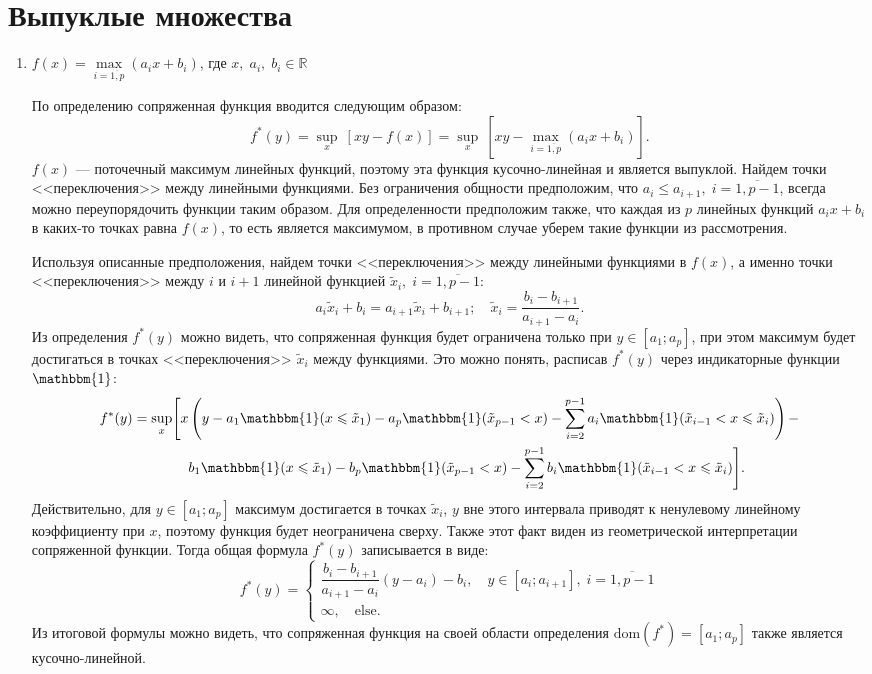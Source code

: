 \documentclass[a4paper,12pt]{article}
\renewcommand{\leq}{\leqslant}
\begin{document}
	\section{Выпуклые множества}
	
	\begin{enumerate}
		\item $f(x) = \max\limits_{i=\overline{1,p}}(a_i x + b_i )$, где $x,\;a_i,\;b_i\in \mathbb{R}$
		
		По определению сопряженная функция вводится следующим образом: 
		$$
		f^*(y) = \sup\limits_x~\left[xy - f(x)\right] = \sup\limits_x~\left[xy - \max\limits_{i=\overline{1,p}} (a_i x + b_i)\right].
		$$
		$f(x)$ --- поточечный максимум линейных функций, поэтому эта функция кусочно-линейная и является выпуклой. Найдем точки <<переключения>> между линейными функциями. Без ограничения общности предположим, что $a_i \leq a_{i+1},\; i=\overline{1,p-1}$, всегда можно переупорядочить функции таким образом. Для определенности предположим также, что каждая из $p$ линейных функций $a_i x + b_i$ в каких-то точках равна $f(x)$, то есть является максимумом, в противном случае уберем такие функции из рассмотрения.
		
		Используя описанные предположения, найдем точки <<переключения>> между линейными функциями в $f(x)$, а именно точки <<переключения>> между $i$ и $i+1$ линейной функцией $\tilde{x}_i,\; i=\overline{1,p-1}$:
		$$
		a_i \tilde{x}_i + b_i = a_{i+1} \tilde{x}_i + b_{i+1};\quad \tilde{x}_i = \frac{b_i - b_{i+1}}{a_{i+1} - a_i}. 
		$$
		Из определения $f^*(y)$ можно видеть, что сопряженная функция будет ограничена только при $y\in[a_1;a_p]$, при этом максимум будет достигаться в точках <<переключения>> $\tilde{x}_i$ между функциями. Это можно понять, расписав  $f^*(y)$ через индикаторные функции $\mathbbm{1}$:
		\begin{equation*}
		\begin{aligned}
		f^*(y) = \sup\limits_x \Biggr[x &\left(y - a_1 \mathbbm{1}(x \leq \tilde{x}_1) - a_p \mathbbm{1}(\tilde{x}_{p-1} < x) - \sum\limits_{i=2}^{p-1} a_i \mathbbm{1}(\tilde{x}_{i-1} < x \leq \tilde{x}_i)\right) - \\		
		& b_1 \mathbbm{1}(x \leq \tilde{x}_1)  - b_p \mathbbm{1}(\tilde{x}_{p-1} < x) - \sum\limits_{i=2}^{p-1} b_i \mathbbm{1}(\tilde{x}_{i-1} < x \leq \tilde{x}_i)\Biggr].
		\end{aligned}
		\end{equation*}
		Действительно, для $y\in[a_1;a_p]$ максимум достигается в точках $\tilde{x}_i$, $y$ вне этого интервала приводят к ненулевому линейному коэффициенту при $x$, поэтому функция будет неограничена сверху. Также этот факт виден из геометрической интерпретации сопряженной функции. Тогда общая формула $f^*(y)$ записывается в виде:
		$$
		f^*(y) = 
		\begin{cases}
			\dfrac{ b_i - b_{i+1}}{a_{i+1}-a_i} (y - a_i) - b_i,\quad y\in[a_i;a_{i+1}],\; i=\overline{1,p-1} \\
			\infty,\quad \text{else}.
		\end{cases}
		$$
		Из итоговой формулы можно видеть, что сопряженная функция на своей области определения $\text{dom}(f^*) = [a_1;a_p]$ также является кусочно-линейной.
		

\end{enumerate}
\end{document}
